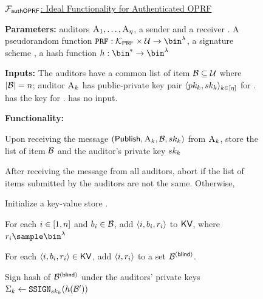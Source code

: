 \begin{figure}
\begin{mdframed}
\footnotesize 

\underline{$\mathcal{F}_{\mathsf{authOPRF}}$: Ideal Functionality for Authenticated OPRF}
		
		
		\smallskip\noindent\textbf{Parameters:} \numAuditors auditors $\auditor[1], \dots, \auditor[\numAuditors]$, a sender \client and a receiver \server. A pseudorandom function $\prf: \prfKeySpace \times \universe   \rightarrow \prfRange$, a signature scheme \sigSchemeDefn, a hash function $\hashFn: \bin^{\ast} \rightarrow \bin^{\secParam}$   

		\smallskip\noindent\textbf{Inputs:} The auditors have a common list of item $\blocklist \subseteq \universe$ where $\setSize{\blocklist} = \blocklistSize$;  auditor $\auditor[\auditorIdx]$ has public-private key pair $\langle \auditorPubKeyGenericScheme[\auditorIdx], \auditorPrivKeyGenericScheme[\auditorIdx] \rangle_{\auditorIdx \in \nats[\numAuditors]}$ for \sigScheme. \client has the key \prfKey for \prf. \server has no input. 



		\smallskip\noindent\textbf{Functionality:} 
\itemListStart

\item	Upon receiving the message $(\publishList, \auditor[\auditorIdx], \blocklist, \auditorPrivKeyGenericScheme[\auditorIdx])$ from $\auditor[\auditorIdx]$, store the list of item $\blocklist$ and the auditor's private key $\auditorPrivKeyGenericScheme[\auditorIdx]$

\item After receiving the \publishList message from all auditors, abort if the list of items \blocklist submitted by the auditors are not the same. Otherwise, 

\enumListStart
\item Initialize a key-value store \kvs. 
\item For each $i \in [1, n]$ and $\genericBlocklistElmt_{\setIdx} \in \blocklist$, add $\langle \setIdx, \genericBlocklistElmt_{\setIdx}, \genericRand_{\setIdx} \rangle$ to $\mathsf{KV}$, where $\genericRand_{\setIdx} \getsr \bin^{\secParam}$

\item For each $\langle \setIdx, \genericBlocklistElmt_{\setIdx}, \genericRand_{\setIdx} \rangle \in \kvs$,  add  $\langle \setIdx, \genericRand_{\setIdx} \rangle$ to a set $\blindedBlocklist$.   

\item Sign hash of $\blindedBlocklist$ under the auditors' private keys $\auditorSig{\auditorIdx} \assign \signGenSig[\auditorPrivKeyGenericScheme[\auditorIdx]](\hashFn(\blocklist'))$


\end{mdframed}
\end{figure}
